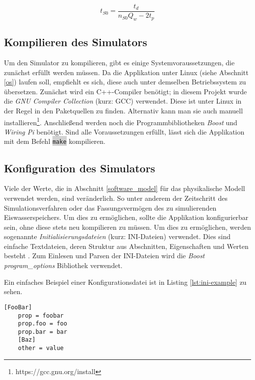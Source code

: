 \begin{equation}\label{eq:sleeptime}
t_{S0} = \frac{t_d}{n_{S0} Q_w - 2 t_p}
\end{equation}

\subsection{Kompilieren des Simulators}\label{simulatorcompile}
Um den Simulator zu kompilieren, gibt es einige Systemvoraussetzungen, die zunächst erfüllt werden müssen. Da die Applikation unter Linux (siehe Abschnitt \ref{os}) laufen soll, empfiehlt es sich, diese auch unter demselben Betriebssystem zu übersetzen. Zunächst wird ein C++-Compiler benötigt; in diesem Projekt wurde die \emph{GNU Compiler Collection} (kurz: GCC) verwendet. Diese ist unter Linux in der Regel in den Paketquellen zu finden. Alternativ kann man sie auch manuell installieren\footnote{https://gcc.gnu.org/install}. Anschließend werden noch die Programmbibliotheken \emph{Boost} und \emph{Wiring Pi} benötigt.
Sind alle Voraussetzungen erfüllt, lässt sich die Applikation mit dem Befehl \colorbox{lightgrey}{\lstinline[basicstyle=\ttfamily]|make|} kompilieren.

\subsection{Konfiguration des Simulators}

Viele der Werte, die in Abschnitt \ref{software_model} für das physikalische Modell verwendet werden, sind veränderlich. So unter anderem der Zeitschritt des Simulationsverfahren oder das Fassungsvermögen des zu simulierenden Eiswasserspeichers. Um dies zu ermöglichen, sollte die Applikation konfigurierbar sein, ohne diese stets neu kompilieren zu müssen. Um dies zu ermöglichen, werden sogenannte \emph{Initialisierungsdateien} (kurz: INI-Dateien) verwendet. Dies sind einfache Textdateien, deren Struktur aus Abschnitten, Eigenschaften und Werten besteht \cite{inifile}.
Zum Einlesen und Parsen der INI-Dateien wird die  \emph{Boost program\_options} Bibliothek verwendet.

Ein einfaches Beispiel einer Konfigurationsdatei ist in Listing \ref{lst:ini-example} zu sehen.

\begin{lstlisting}[frame=single, caption=INI-Datei Beispiel, label=lst:ini-example]
	[FooBar]
	prop = foobar
	prop.foo = foo
	prop.bar = bar
	[Baz]
	other = value
\end{lstlisting}

